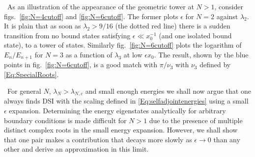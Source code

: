 \documentclass[aps,prl,reprint,preprintnumbers]{revtex4-1}
\begin{document}
{\ As an illustration of the appearance of the geometric tower at $N>1$, consider figs.~\ref{fig:N=4cutoff} and \ref{fig:N=6cutoff}. The former plots $\epsilon$ for $N=2$ against $\lambda_{2}$. It is plain that as soon as $\lambda_{2}>9/16$ (the dotted red line) there is a sudden transition from no bound states satisfying $\epsilon \ll x_0^{-1}$  (and one isolated bound state), to a tower of states. Similarly fig.~\ref{fig:N=6cutoff} plots the logarithm of $E_{n}/E_{n+1}$ for $N=3$ as a function of $\lambda_{3}$ at low $\epsilon x_{0}$. The result, shown by the blue points in fig.~\ref{fig:N=6cutoff}, is a good match with $\pi/\nu_{3}$ with $\nu_{3}$ defined by \eqref{Eq:SpecialRoots}.}

{\ For general $N$, $\lambda_{N} > \lambda_{N,c}$ and small enough energies we shall now argue that one always finds DSI with the scaling defined in \eqref{Eq:selfadjointenergies} using a small $\epsilon$ expansion. Determining the energy eigenstates analytically for arbitrary boundary conditions is made difficult for $N>1$ due to the presence of multiple distinct complex roots in the small energy expansion. However, we shall show that one pair makes a contribution that decays more slowly as $\epsilon \rightarrow 0$ than any other and derive an approximation in this limit.}
\end{document}
